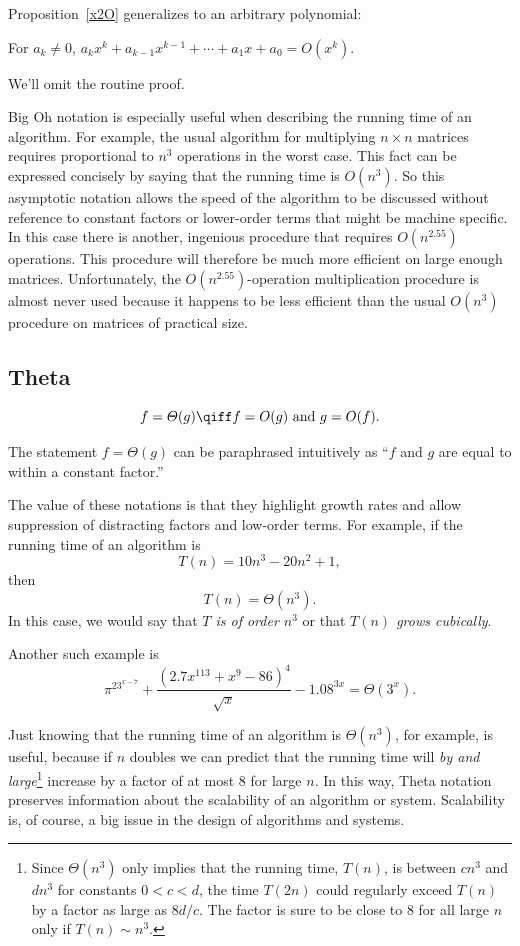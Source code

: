 Proposition~\ref{x2O} generalizes to an arbitrary polynomial:
\begin{proposition}
For $a_k\neq 0$, $a_k x^k + a_{k-1} x^{k-1} + \cdots + a_1x + a_0 = O(x^k)$.
\end{proposition}
We'll omit the routine proof.

Big Oh notation is especially useful when describing the running time of
an algorithm.  For example, the usual algorithm for multiplying $n \times
n$ matrices requires proportional to $n^3$ operations in the worst case.
This fact can be expressed concisely by saying that the running time is
$O(n^3)$.  So this asymptotic notation allows the speed of the algorithm
to be discussed without reference to constant factors or lower-order terms
that might be machine specific.  In this case there is another, ingenious
 procedure that requires $O(n^{2.55})$
operations.  This procedure will therefore be much more efficient on large
enough matrices.  Unfortunately, the $O(n^{2.55})$-operation
multiplication procedure is almost never used because it happens to be
less efficient than the usual $O(n^3)$ procedure on matrices of practical
size.  

\subsection{\index{$\Theta()$}Theta}

\begin{definition}
\[
f = \varTheta(g)
\qiff
f=O(g) \text{ and } g=O(f).
\]
\end{definition}

The statement $f = \varTheta(g)$ can be paraphrased intuitively as ``$f$
and $g$ are equal to within a constant factor.''

The value of these notations is that they highlight growth rates and allow
suppression of distracting factors and low-order terms.  For example, if
the running time of an algorithm is
\[
T(n) = 10n^3 - 20n^2 + 1,
\]
then
\[
T(n) = \varTheta(n^3).
\]
In this case, we would say that \emph{$T$ is of order $n^3$} or that
\emph{$T(n)$ grows cubically}.

Another such example is
\[
{{\pi^23^{x-7} + \frac{(2.7x^{113} + x^9- 86)^4}{\sqrt{x}} - 1.08^{3x}}} =
\varTheta(3^x).
\]

Just knowing that the running time of an algorithm is $\varTheta(n^3)$, for
example, is useful, because if $n$ doubles we can predict that the running
time will \emph{by and large}\footnote{Since $\varTheta(n^3)$ only implies
that the running time, $T(n)$, is between $cn^3$ and $dn^3$ for constants
$0<c<d$, the time $T(2n)$ could regularly exceed $T(n)$ by a factor as large
as $8d/c$.  The factor is sure to be close to 8 for all large $n$ only if
$T(n) \sim n^3$.} increase by a factor of at most $8$ for large $n$.  In
this way, Theta notation preserves information about the scalability of an
algorithm or system.  Scalability is, of course, a big issue in the design
of algorithms and systems.

